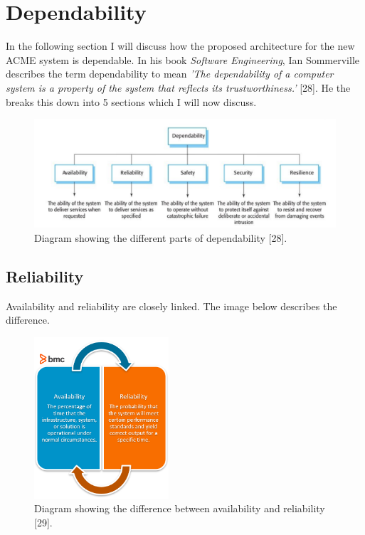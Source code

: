 \section{Dependability}
  \label{sec:Dependability}
  In the following section I will discuss how the proposed architecture for the new ACME system is dependable. In his book \textit{Software Engineering}, Ian 
  Sommerville describes the term dependability to mean \textit{'The dependability of a computer system is a property of the system that reflects its 
  trustworthiness.'} [28]. He the breaks this down into 5 sections which I will now discuss.

  \begin{figure}[H]
    \centering
    \includegraphics[width=12cm]{assets/dependability.png}
    \caption{Diagram showing the different parts of dependability [28].}
    \label{fig:dependability}
  \end{figure}

  \subsection{Reliability}
  Availability and reliability are closely linked. The image below describes the difference.
  \begin{figure}[H]
    \centering
    \includegraphics[width=5cm]{assets/avail-reliab.png}
    \caption{Diagram showing the difference between availability and reliability [29].}
    \label{fig:availabilityVsReliability}
  \end{figure}

